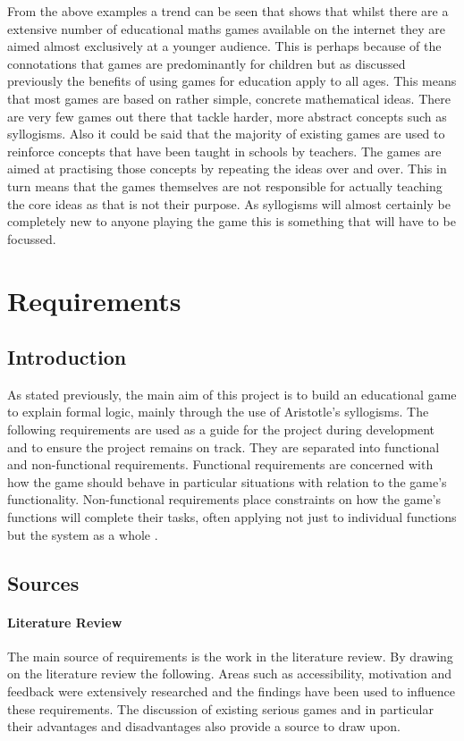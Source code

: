 \documentclass[12pt,a4paper]{report}
\begin{document}
From the above examples a trend can be seen that shows that whilst there are a extensive number of educational maths games available on the internet they are aimed almost exclusively at a younger audience. This is perhaps because of the connotations that games are predominantly for children but as discussed previously the benefits of using games for education apply to all ages. This means that most games are based on rather simple, concrete mathematical ideas. There are very few games out there that tackle harder, more abstract concepts such as syllogisms. Also it could be said that the majority of existing games are used to reinforce concepts that have been taught in schools by teachers. The games are aimed at practising those concepts by repeating the ideas over and over. This in turn means that the games themselves are not responsible for actually teaching the core ideas as that is not their purpose. As syllogisms will almost certainly be completely new to anyone playing the game this is something that will have to be focussed.


\chapter{Requirements}
\section{Introduction}
As stated previously, the main aim of this project is to build an educational game to explain formal logic, mainly through the use of Aristotle's syllogisms. The following requirements are used as a guide for the project during development and to ensure the project remains on track. They are separated into functional and non-functional requirements. Functional requirements are concerned with how the game should behave in particular situations with relation to the game's functionality. 
Non-functional requirements place constraints on how the game's functions will complete their tasks, often applying not just to individual functions but the system as a whole \citep{Sommerville:2006:SE:1196763}.

\section{Sources}
\subsubsection{Literature Review}
The main source of requirements is the work in the literature review. By drawing on the literature review the following. Areas such as accessibility, motivation and feedback were extensively researched and the findings have been used to influence these requirements. The discussion of existing serious games and in particular their advantages and disadvantages also provide a source to draw upon.
\end{document}
